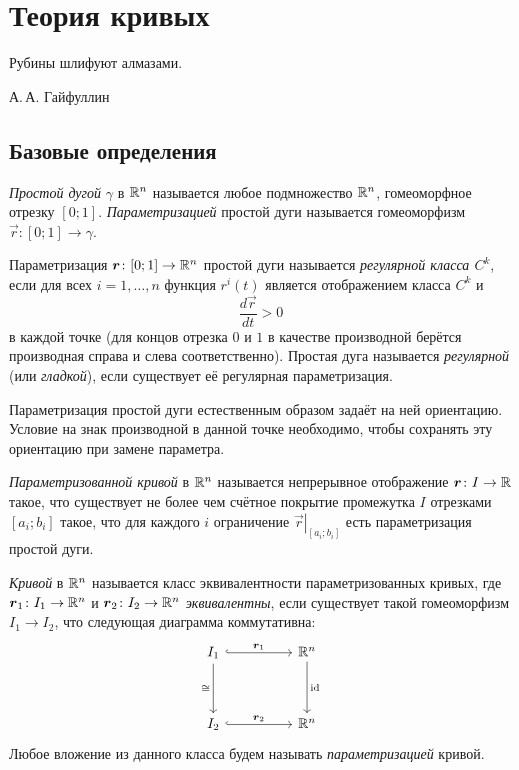 \section{Теория кривых}

\epigraph{Рубины шлифуют алмазами.}{А.\,А. Гайфуллин}

\subsection{Базовые определения}

\begin{definition}
	\textit{Простой дугой} $\gamma$ в $\mathbb{R}^n$ называется любое подмножество $\mathbb{R}^n$, гомеоморфное отрезку $[0; 1]$. \textit{Параметризацией} простой дуги называется гомеоморфизм $\vec{r}\colon [0; 1] \to \gamma$.
\end{definition}

\begin{definition}
	Параметризация $\boldsymbol{r}\colon [0; 1] \to \mathbb{R}^n$ простой дуги называется \textit{регулярной класса $C^k$}, если для всех $i = 1, \ldots, n$ функция $r^i(t)$ является отображением класса $C^k$ и
	\[
		\frac{d\vec{r}}{dt} > 0
	\]
	в каждой точке (для концов отрезка $0$ и $1$ в качестве производной берётся производная справа и слева соответственно). Простая дуга называется \textit{регулярной} (или \textit{гладкой}), если существует её регулярная параметризация.
\end{definition}

Параметризация простой дуги естественным образом задаёт на ней ориентацию. Условие на знак производной в данной точке необходимо, чтобы сохранять эту ориентацию при замене параметра.

\begin{definition}
	\textit{Параметризованной кривой} в $\mathbb{R}^n$ называется непрерывное отображение $\boldsymbol{r}\colon I \to \mathbb{R}$ такое, что существует не более чем счётное покрытие промежутка $I$ отрезками $[a_i; b_i]$ такое, что для каждого $i$ ограничение $\left.\vec{r}\right|_{[a_i; b_i]}$ есть параметризация простой дуги.
\end{definition}

\begin{definition}
	\textit{Кривой} в $\mathbb{R}^n$ называется класс эквивалентности параметризованных кривых, где $\boldsymbol{r}_1\colon I_1 \to \mathbb{R}^n$ и $\boldsymbol{r}_2\colon I_2 \to \mathbb{R}^n$ \textit{эквивалентны}, если существует такой гомеоморфизм $I_1 \to I_2$, что следующая диаграмма коммутативна:
	\begin{equation*}
		\begin{tikzcd}
			I_1 && {\R^n} \\
			\\
			I_2 && {\R^n}
			\arrow["\vec{r}_1", hook, from=1-1, to=1-3]
			\arrow["\cong"', from=1-1, to=3-1]
			\arrow["\id", from=1-3, to=3-3]
			\arrow["\vec{r}_2", hook, from=3-1, to=3-3]
		\end{tikzcd}
	\end{equation*}
	Любое вложение из данного класса будем называть \textit{параметризацией} кривой.
\end{definition}

